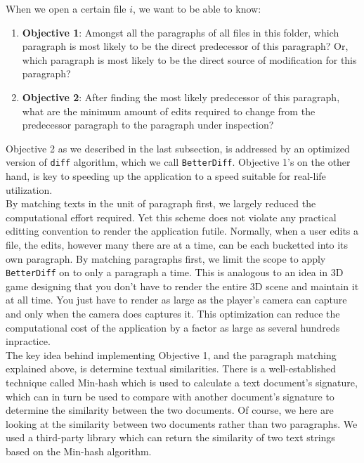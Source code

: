 \documentclass{article}
\begin{document}
When we open a certain file $i$, we want to be able to know:
\begin{enumerate}
  \item \textbf{Objective 1}: Amongst all the paragraphs of all files in this folder, which paragraph is most likely to be the direct predecessor of this paragraph? Or, which paragraph is most likely to be the direct source of modification for this paragraph?
  \item \textbf{Objective 2}: After finding the most likely predecessor of this paragraph, what are the minimum amount of edits required to change from the predecessor paragraph to the paragraph under inspection?
\end{enumerate}

Objective 2 as we described in the last subsection, is addressed by an optimized version of \texttt{diff} algorithm, which we call \texttt{BetterDiff}. Objective 1's on the other hand, is key to speeding up the application to a speed suitable for real-life utilization. \\

By matching texts in the unit of paragraph first, we largely reduced the computational effort required. Yet this scheme does not violate any practical editting convention to render the application futile. Normally, when a user edits a file, the edits, however many there are at a time, can be each bucketted into its own paragraph. By matching paragraphs first, we limit the scope to apply \texttt{BetterDiff} on to only a paragraph a time.  This is analogous to an idea in 3D game designing that you don't have to render the entire 3D scene and maintain it at all time. You just have to render as large as the player's camera can capture and only when the camera does captures it. This optimization can reduce the computational cost of the application by a factor as large as several hundreds inpractice. \\

The key idea behind implementing Objective 1, and the paragraph matching explained above, is determine textual similarities. There is a well-established technique called Min-hash which is used to calculate a text document's signature, which can in turn be used to compare with another document's signature to determine the similarity between the two documents. Of course, we here are looking at the similarity between two documents rather than two paragraphs. We used a third-party library \cite{minhash} which can return the similarity of two text strings based on the Min-hash algorithm. \\
\end{document}
